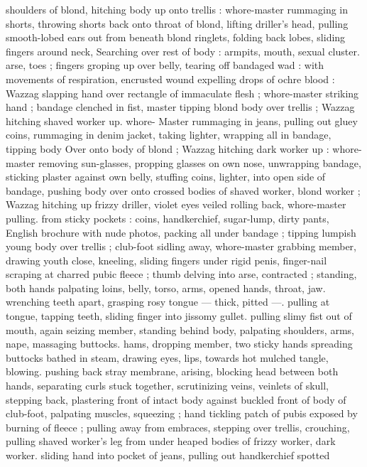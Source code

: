 shoulders of blond, hitching body up onto trellis : whore-master
rummaging in shorts, throwing shorts back onto throat of blond,
lifting driller's head, pulling smooth-lobed ears out from beneath
blond ringlets, folding back lobes, sliding fingers around neck,
Searching over rest of body : armpits, mouth, sexual cluster. arse,
toes ; fingers groping up over belly, tearing off bandaged wad : with
movements of respiration, encrusted wound expelling drops of ochre
blood : Wazzag slapping hand over rectangle of immaculate flesh ;
whore-master striking hand ; bandage clenched in fist, master tipping
blond body over trellis ; Wazzag hitching shaved worker up. whore-
Master rummaging in jeans, pulling out gluey coins, rummaging in
denim jacket, taking lighter, wrapping all in bandage, tipping body
Over onto body of blond ; Wazzag hitching dark worker up : whore-
master removing sun-glasses, propping glasses on own nose,
unwrapping bandage, sticking plaster against own belly, stuffing
coins, lighter, into open side of bandage, pushing body over onto
crossed bodies of shaved worker, blond worker ; Wazzag hitching up
frizzy driller, violet eyes veiled rolling back, whore-master pulling.
from sticky pockets : coins, handkerchief, sugar-lump, dirty pants,
English brochure with nude photos, packing all under bandage ;
tipping lumpish young body over trellis ; club-foot sidling away,
whore-master grabbing member, drawing youth close, kneeling,
sliding fingers under rigid penis, finger-nail scraping at charred
pubic fleece ; thumb delving into arse, contracted ; standing, both
hands palpating loins, belly, torso, arms, opened hands, throat, jaw.
wrenching teeth apart, grasping rosy tongue --- thick, pitted ---.
pulling at tongue, tapping teeth, sliding finger into jissomy gullet.
pulling slimy fist out of mouth, again seizing member, standing
behind body, palpating shoulders, arms, nape, massaging buttocks.
hams, dropping member, two sticky hands spreading buttocks bathed
in steam, drawing eyes, lips, towards hot mulched tangle, blowing.
pushing back stray membrane, arising, blocking head between both
hands, separating curls stuck together, scrutinizing veins, veinlets of
skull, stepping back, plastering front of intact body against buckled
front of body of club-foot, palpating muscles, squeezing ; hand
tickling patch of pubis exposed by burning of fleece ; pulling away
from embraces, stepping over trellis, crouching, pulling shaved
worker's leg from under heaped bodies of frizzy worker, dark worker.
sliding hand into pocket of jeans, pulling out handkerchief spotted
